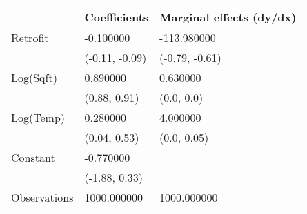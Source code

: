 \begin{tabular}{lll}
\toprule
 & Coefficients & Marginal effects (dy/dx) \\
\midrule
Retrofit & -0.100000 & -113.980000 \\
  & (-0.11, -0.09) & (-0.79, -0.61) \\
Log(Sqft) & 0.890000 & 0.630000 \\
  & (0.88, 0.91) & (0.0, 0.0) \\
Log(Temp) & 0.280000 & 4.000000 \\
  & (0.04, 0.53) & (0.0, 0.05) \\
Constant & -0.770000 &   \\
  & (-1.88, 0.33) &   \\
Observations & 1000.000000 & 1000.000000 \\
\bottomrule
\end{tabular}
